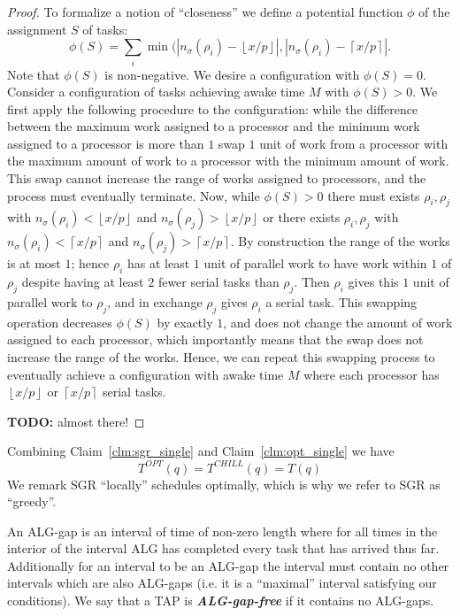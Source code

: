 \documentclass[twocolumn]{article}[10pt]
\newcommand{\defn}[1]{{\textit{\textbf{\boldmath #1}}}\xspace}
\newcommand{\todo}[1]{{\color{red}\textbf{TODO:} #1}}
\newcommand{\floor}[1]{\left\lfloor #1 \right\rfloor}
\newcommand{\ceil}[1]{\left\lceil #1 \right\rceil}
\begin{document}
\begin{proof}
  To formalize a notion of \enquote{closeness} we define a potential 
  function $\phi$ of the assignment $S$ of tasks:
  $$\phi(S) = \sum_{i} \min(|n_\sigma(\rho_i)-\floor{x/p}|, |n_\sigma(\rho_i)-\ceil{x/p}|.$$ 
  Note that $\phi(S)$ is non-negative. We desire a configuration with $\phi(S) = 0$.
  Consider a configuration of tasks achieving awake time $M$ with $\phi(S) > 0$.
  We first apply the following procedure to the configuration:
  while the difference between the maximum work assigned to a
  processor and the minimum work assigned to a processor is more
  than $1$ swap $1$ unit of work from a processor with the
  maximum amount of work to a processor with the minimum amount
  of work. This swap cannot increase the range of works assigned
  to processors, and the process must eventually terminate.
  Now, while $\phi(S) > 0$ there must 
  exists $\rho_i, \rho_j$ with $n_\sigma(\rho_i) < \floor{x/p}$
  and $n_\sigma(\rho_j) > \floor{x/p}$ or there exists $\rho_i,
  \rho_j$ with $n_\sigma(\rho_i) < \ceil{x/p}$ and
  $n_\sigma(\rho_j) > \ceil{x/p}$. By construction the range of
  the works is at most $1$; hence $\rho_i$ has at least $1$ unit
  of parallel work to have work within $1$ of $\rho_j$ despite
  having at least $2$ fewer serial tasks than $\rho_j$. Then
  $\rho_i$ gives this $1$ unit of parallel work to $\rho_j$, and
  in exchange $\rho_j$ gives $\rho_i$ a serial task. This
  swapping operation decreases $\phi(S)$ by exactly $1$, and does
  not change the amount of work assigned to each processor, which
  importantly means that the swap does not increase the range of
  the works. Hence, we can repeat this swapping process to
  eventually achieve a configuration with awake time $M$ where each 
  processor has $\floor{x/p}$ or $\ceil{x/p}$ serial tasks.

  \todo{almost there!}

\end{proof}

Combining Claim~\ref{clm:sgr_single} and
Claim~\ref{clm:opt_single} we have
\begin{equation}
  \label{eq:same_single}
  T^{OPT}(q) = T^{CHILL}(q) = T(q)
\end{equation}
We remark SGR \enquote{locally} schedules optimally, which is
why we refer to SGR as \enquote{greedy}. 

An ALG-gap is an interval of time of non-zero length where for
all times in the interior of the interval ALG has completed every
task that has arrived thus far. Additionally for an interval to
be an ALG-gap the interval must contain no other intervals which
are also ALG-gaps (i.e. it is a \enquote{maximal} interval
satisfying our conditions).
We say that a TAP is \defn{ALG-gap-free} if it contains no ALG-gaps.
\end{document}
